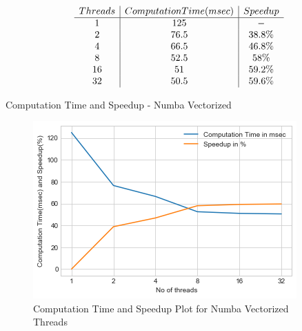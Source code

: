 \documentclass{article}
\begin{document}
\begin{table}[h!]
    \centering
    \begin{align}
    \begin{array}{c | c | c}
         Threads  & Computation Time(msec) & Speedup \\ 
         \hline %
         1   & 125 & - \\
         2   & 76.5 &  38.8\%  \\
         4   & 66.5 & 46.8\% \\
         8   & 52.5 & 58\% \\
         16   & 51 & 59.2\% \\
         32   & 50.5 & 59.6\% \\
    \end{array}
\end{align}
    \caption{Computation Time and Speedup - Numba Vectorized}
    \label{tab:my_label}
\end{table}



\begin{figure}
    \centering
    \includegraphics{speedup_plot.png}
    \caption{Computation Time and Speedup Plot for Numba Vectorized Threads}
    \label{fig:my_label}
\end{figure}
\end{document}
